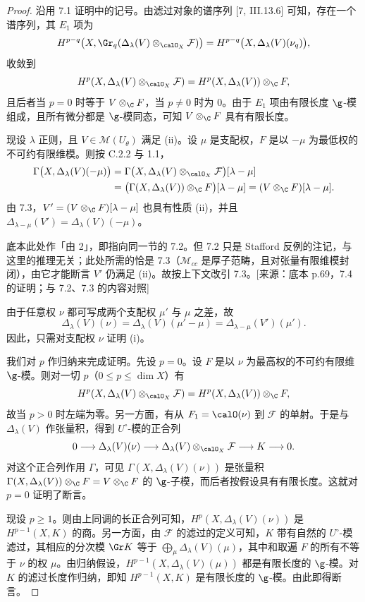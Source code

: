 \begin{proof}
沿用 7.1 证明中的记号。由滤过对象的谱序列 [7, III.13.6] 可知，存在一个谱序列，其 $E_1$ 项为
$$H^{p-q}\bigl(X,\Gr_q(\Delta_\lambda(V)\otimes_{\calO_X}\mathcal{F})\bigr)=H^{p-q}\bigl(X,\Delta_\lambda(V)(\nu_q)\bigr),$$
收敛到
$$H^p(X,\Delta_\lambda(V)\otimes_{\calO_X}\mathcal{F})=H^p(X,\Delta_\lambda(V))\otimes_\C F,$$
且后者当 $p=0$ 时等于 $V\otimes_\C F$，当 $p\ne0$ 时为 $0$。由于 $E_1$ 项由有限长度 $\g$-模组成，且所有微分都是 $\g$-模同态，可知 $V\otimes_\C F$ 具有有限长度。

现设 $\lambda$ 正则，且 $V\in\mathcal{M}(U_\theta)$ 满足 (ii)。设 $\mu$ 是支配权，$F$ 是以 $-\mu$ 为最低权的不可约有限维模。则按 C.2.2 与 1.1，
\begin{align*}
\Gamma\bigl(X,\Delta_\lambda(V)(-\mu)\bigr)&=\Gamma\bigl(X,\Delta_\lambda(V)\otimes_{\calO_X}\mathcal{F}\bigr)[\lambda-\mu]\\
&=\bigl(\Gamma(X,\Delta_\lambda(V))\otimes_\C F\bigr)[\lambda-\mu]=(V\otimes_\C F)[\lambda-\mu].
\end{align*}
由 7.3，$V'=(V\otimes_\C F)[\lambda-\mu]$ 也具有性质 (ii)，并且 $\Delta_{\lambda-\mu}(V')=\Delta_\lambda(V)(-\mu)$。
\begin{annote}
底本此处作「由 2」，即指向同一节的 7.2。但 7.2 只是 Stafford 反例的注记，与这里的推理无关；此处所需的恰是 7.3（$\mathcal{M}_{cc}$ 是厚子范畴，且对张量有限维模封闭），由它才能断言 $V'$ 仍满足 (ii)。故按上下文改引 7.3。[来源：底本 p.69，7.4 的证明；与 7.2、7.3 的内容对照]
\end{annote}

由于任意权 $\nu$ 都可写成两个支配权 $\mu'$ 与 $\mu$ 之差，故
$$\Delta_\lambda(V)(\nu)=\Delta_\lambda(V)(\mu'-\mu)=\Delta_{\lambda-\mu}(V')(\mu').$$
因此，只需对支配权 $\nu$ 证明 (i)。

我们对 $p$ 作归纳来完成证明。先设 $p=0$。设 $F$ 是以 $\nu$ 为最高权的不可约有限维 $\g$-模。则对一切 $p$（$0\le p\le\dim X$）有
$$H^p(X,\Delta_\lambda(V)\otimes_{\calO_X}\mathcal{F})=H^p(X,\Delta_\lambda(V))\otimes_\C F,$$
故当 $p>0$ 时左端为零。另一方面，有从 $F_1=\calO(\nu)$ 到 $\mathcal{F}$ 的单射。于是与 $\Delta_\lambda(V)$ 作张量积，得到 $U^\circ$-模的正合列
$$0\longrightarrow\Delta_\lambda(V)(\nu)\longrightarrow\Delta_\lambda(V)\otimes_{\calO_X}\mathcal{F}\longrightarrow K\longrightarrow0.$$
对这个正合列作用 $\Gamma$，可见 $\Gamma(X,\Delta_\lambda(V)(\nu))$ 是张量积 $\Gamma(X,\Delta_\lambda(V))\otimes_\C F=V\otimes_\C F$ 的 $\g$-子模，而后者按假设具有有限长度。这就对 $p=0$ 证明了断言。

现设 $p\ge1$。则由上同调的长正合列可知，$H^p(X,\Delta_\lambda(V)(\nu))$ 是 $H^{p-1}(X,K)$ 的商。另一方面，由 $\mathcal{F}$ 的滤过的定义可知，$K$ 带有自然的 $U^\circ$-模滤过，其相应的分次模 $\Gr K$ 等于 $\bigoplus_\mu\Delta_\lambda(V)(\mu)$，其中和取遍 $F$ 的所有不等于 $\nu$ 的权 $\mu$。由归纳假设，$H^{p-1}(X,\Delta_\lambda(V)(\mu))$ 都是有限长度的 $\g$-模。对 $K$ 的滤过长度作归纳，即知 $H^{p-1}(X,K)$ 是有限长度的 $\g$-模。由此即得断言。
\end{proof}


